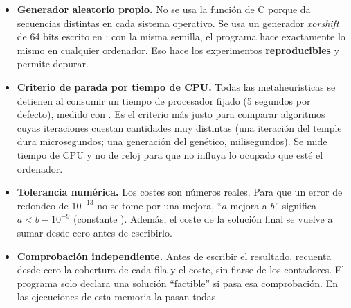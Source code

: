 \begin{itemize}
  \item \textbf{Generador aleatorio propio.} No se usa la función  de C porque da
        secuencias distintas en cada sistema operativo. Se usa un generador \emph{xorshift}
        de 64 bits escrito en : con la misma semilla, el programa hace
        exactamente lo mismo en cualquier ordenador. Eso hace los experimentos
        \textbf{reproducibles} y permite depurar.
  \item \textbf{Criterio de parada por tiempo de CPU.} Todas las metaheurísticas se detienen
        al consumir un tiempo de procesador fijado (5 segundos por defecto), medido con
        . Es el criterio más justo para comparar algoritmos cuyas iteraciones
        cuestan cantidades muy distintas (una iteración del temple dura microsegundos; una
        generación del genético, milisegundos). Se mide tiempo de CPU y no de reloj para que
        no influya lo ocupado que esté el ordenador.
  \item \textbf{Tolerancia numérica.} Los costes son números reales. Para que un error de
        redondeo de $10^{-13}$ no se tome por una mejora, ``$a$ mejora a $b$'' significa
        $a<b-10^{-9}$ (constante ). Además, el coste de la solución final se vuelve a
        sumar desde cero antes de escribirlo.
  \item \textbf{Comprobación independiente.} Antes de escribir el resultado,
         recuenta desde cero la cobertura de cada fila y el coste, sin
        fiarse de los contadores. El programa solo declara una solución ``factible'' si pasa
        esa comprobación. En las  ejecuciones de esta memoria
        la pasan todas.
\end{itemize}
